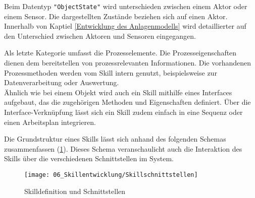 	 \begin{bfhNoteBox}
	 	Beim Datentyp \verb|"ObjectState"| wird unterschieden zwischen einem Aktor oder einem Sensor. Die dargestellten Zustände beziehen sich auf einen Aktor. Innerhalb von Kaptiel \ref{Entwicklung des Anlagenmodells} wird detaillierter auf den Unterschied zwischen Aktoren und Sensoren eingegangen. 
	 \end{bfhNoteBox}
	 \vspace{3mm}
	 
	 Als letzte Kategorie umfasst die Prozesselemente. Die Prozesseigenschaften dienen dem bereitstellen von prozessrelevanten Informationen. Die vorhandenen Prozessmethoden werden vom Skill intern genutzt, beispielsweise zur Datenverarbeitung oder  Auswertung.
	 \\
	 Ähnlich wie bei einem Objekt wird auch ein Skill mithilfe eines Interfaces aufgebaut, das die zugehörigen Methoden und Eigenschaften definiert. Über die Interface-Verknüpfung lässt sich ein Skill zudem einfach in eine Sequenz oder einen Arbeitsplan integrieren.
	 
	 \newpage
	 
	 Die Grundstruktur eines Skills lässt sich anhand des folgenden Schemas zusammenfassen (\ref{fig:Skillschnittstellen}). Dieses Schema veranschaulicht auch die Interaktion des Skills über die verschiedenen Schnittstellen im System.
	 
	 \begin{figure}[h!]
	 	\centering
	 	\texttt{[image: 06\_Skillentwicklung/Skillschnittstellen]}
	 	\captionsetup{justification=centering}
	 	\caption{Skilldefinition und Schnittstellen}
	 	\label{fig:Skillschnittstellen}
	 \end{figure}
	 
	 \newpage
	 
	 